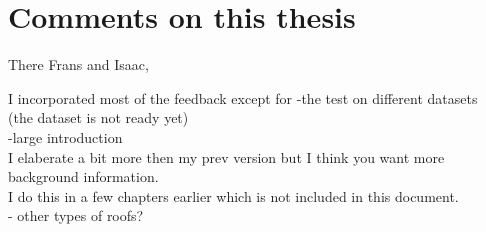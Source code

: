 \documentclass[10pt]{article}
\begin{document}
% 



\section{Comments on this thesis}
There Frans and Isaac,

I incorporated most of the feedback except for
-the test on different datasets\\
(the dataset is not ready yet)\\
-large introduction\\
I elaberate a bit more then my prev version but I think you want more background
information.\\
I do this in a few chapters earlier which is not included in this document.\\
- other types of roofs?\\
\end{document}

